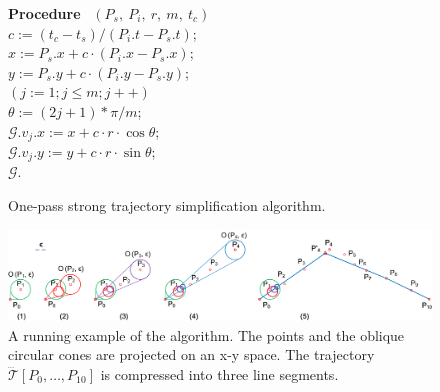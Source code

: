 \begin{figure}[tb!]
\begin{center}
{\begin{minipage}{3.36in}
{					{\bf Procedure} ~$(P_s,~P_i,~r,~m,~t_c)$ \\
					\bcc \hspace{1ex} $c := (t_c-t_s)/(P_i.t - P_s.t)$; \\
					\icc \hspace{1ex} $x := P_s.x + c\cdot(P_i.x-P_s.x)$; \\
					\icc \hspace{1ex} $y := P_s.y + c\cdot(P_i.y-P_s.y)$; \\
					\icc \hspace{1ex} \For $(j := 1;j \le m;j++)$ \Do \\
					\icc \> \hspace{2ex} $\theta :=  (2j + 1)*\pi /m $; \\
					\icc \> \hspace{2ex} $\mathcal{G}.v_j.x := x + c\cdot r\cdot\cos\theta$;\\
					\icc \> \hspace{2ex} $\mathcal{G}.v_j.y := y + c\cdot r\cdot\sin\theta$;\\
					\icc \hspace{1ex} \Return $\mathcal{G}$.
				}
				\vspace{-2ex}
				\myhrule
			\end{minipage}
		}
	\end{center}
	\vspace{-2ex}
	\caption{\small One-pass strong trajectory  simplification algorithm.}
	\label{alg:CI3d}
	\vspace{-2ex}
\end{figure}


\begin{figure}[tb!]
\centering
\includegraphics[scale=0.79]{figures/Fig-Conesta.png}
\caption{\small A running example of the \cista algorithm. The points and the oblique circular cones are projected on an x-y space. The trajectory $\dddot{\mathcal{T}}[P_0, \ldots, P_{10}]$ is compressed into three line segments.}
\vspace{-2ex}
\label{fig:exm-consta}
\end{figure}


